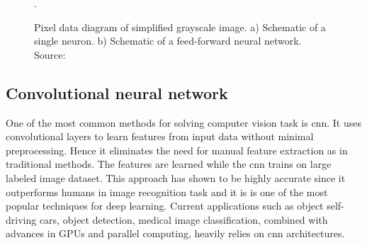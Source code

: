             \begin{figure}[ht]
                \centering
                \qquad
                \caption{Pixel data diagram of simplified grayscale image. a) Schematic of a single neuron. b) Schematic of a feed-forward neural network. Source: \cite{nnfurtado}}.
                \label{fig:neuron and neural network}
            \end{figure}
            
    \subsection{Convolutional neural network}
        One of the most common methods for solving computer vision task is \gls{cnn}. It uses convolutional layers to learn features from input data without minimal preprocessing. Hence it eliminates the need for manual feature extraction as in traditional methods. The features are learned while the \gls{cnn} trains on large labeled image dataset. This approach has shown to be highly accurate since it outperforms humans in image recognition task \cite{russakovsky2015imagenet} and it is is one of the most popular techniques for deep learning. Current applications such as object self-driving cars, object detection, medical image classification, combined with advances in GPUs and parallel computing, heavily relies on \gls{cnn} architectures. 

